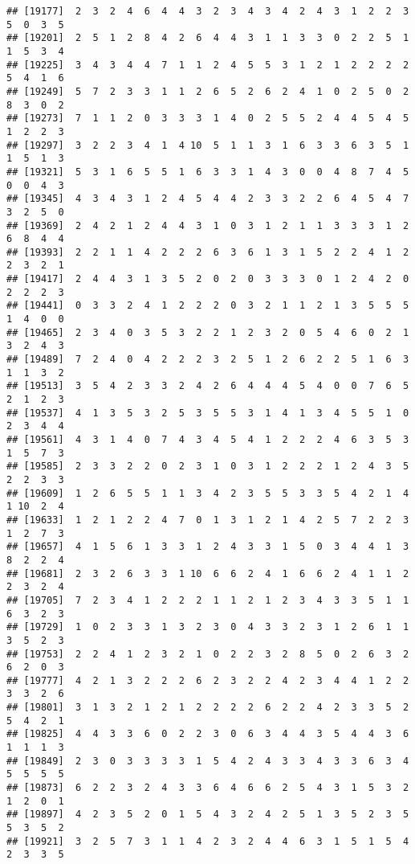 \documentclass[
]{article}
\begin{document}
\begin{verbatim}
## [19177]  2  3  2  4  6  4  4  3  2  3  4  3  4  2  4  3  1  2  2  3  5  0  3  5
## [19201]  2  5  1  2  8  4  2  6  4  4  3  1  1  3  3  0  2  2  5  1  1  5  3  4
## [19225]  3  4  3  4  4  7  1  1  2  4  5  5  3  1  2  1  2  2  2  2  5  4  1  6
## [19249]  5  7  2  3  3  1  1  2  6  5  2  6  2  4  1  0  2  5  0  2  8  3  0  2
## [19273]  7  1  1  2  0  3  3  3  1  4  0  2  5  5  2  4  4  5  4  5  1  2  2  3
## [19297]  3  2  2  3  4  1  4 10  5  1  1  3  1  6  3  3  6  3  5  1  1  5  1  3
## [19321]  5  3  1  6  5  5  1  6  3  3  1  4  3  0  0  4  8  7  4  5  0  0  4  3
## [19345]  4  3  4  3  1  2  4  5  4  4  2  3  3  2  2  6  4  5  4  7  3  2  5  0
## [19369]  2  4  2  1  2  4  4  3  1  0  3  1  2  1  1  3  3  3  1  2  6  8  4  4
## [19393]  2  2  1  1  4  2  2  2  6  3  6  1  3  1  5  2  2  4  1  2  2  3  2  1
## [19417]  2  4  4  3  1  3  5  2  0  2  0  3  3  3  0  1  2  4  2  0  2  2  2  3
## [19441]  0  3  3  2  4  1  2  2  2  0  3  2  1  1  2  1  3  5  5  5  1  4  0  0
## [19465]  2  3  4  0  3  5  3  2  2  1  2  3  2  0  5  4  6  0  2  1  3  2  4  3
## [19489]  7  2  4  0  4  2  2  2  3  2  5  1  2  6  2  2  5  1  6  3  1  1  3  2
## [19513]  3  5  4  2  3  3  2  4  2  6  4  4  4  5  4  0  0  7  6  5  2  1  2  3
## [19537]  4  1  3  5  3  2  5  3  5  5  3  1  4  1  3  4  5  5  1  0  2  3  4  4
## [19561]  4  3  1  4  0  7  4  3  4  5  4  1  2  2  2  4  6  3  5  3  1  5  7  3
## [19585]  2  3  3  2  2  0  2  3  1  0  3  1  2  2  2  1  2  4  3  5  2  2  3  3
## [19609]  1  2  6  5  5  1  1  3  4  2  3  5  5  3  3  5  4  2  1  4  1 10  2  4
## [19633]  1  2  1  2  2  4  7  0  1  3  1  2  1  4  2  5  7  2  2  3  1  2  7  3
## [19657]  4  1  5  6  1  3  3  1  2  4  3  3  1  5  0  3  4  4  1  3  8  2  2  4
## [19681]  2  3  2  6  3  3  1 10  6  6  2  4  1  6  6  2  4  1  1  2  2  3  2  4
## [19705]  7  2  3  4  1  2  2  2  1  1  2  1  2  3  4  3  3  5  1  1  6  3  2  3
## [19729]  1  0  2  3  3  1  3  2  3  0  4  3  3  2  3  1  2  6  1  1  3  5  2  3
## [19753]  2  2  4  1  2  3  2  1  0  2  2  3  2  8  5  0  2  6  3  2  6  2  0  3
## [19777]  4  2  1  3  2  2  2  6  2  3  2  2  4  2  3  4  4  1  2  2  3  3  2  6
## [19801]  3  1  3  2  1  2  1  2  2  2  2  6  2  2  4  2  3  3  5  2  5  4  2  1
## [19825]  4  4  3  3  6  0  2  2  3  0  6  3  4  4  3  5  4  4  3  6  1  1  1  3
## [19849]  2  3  0  3  3  3  3  1  5  4  2  4  3  3  4  3  3  6  3  4  5  5  5  5
## [19873]  6  2  2  3  2  4  3  3  6  4  6  6  2  5  4  3  1  5  3  2  1  2  0  1
## [19897]  4  2  3  5  2  0  1  5  4  3  2  4  2  5  1  3  5  2  3  5  5  3  5  2
## [19921]  3  2  5  7  3  1  1  4  2  3  2  4  4  6  3  1  5  1  5  4  2  3  3  5

\end{verbatim}
\end{document}
